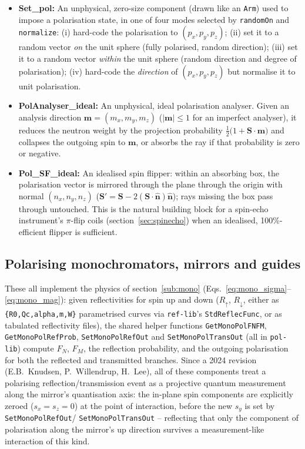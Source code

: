 \begin{itemize}
\item \textbf{Set\_pol:} An unphysical, zero-size component (drawn like an
  \texttt{Arm}) used to impose a polarisation state, in one of four modes
  selected by \texttt{randomOn} and \texttt{normalize}: (i) hard-code the
  polarisation to $(p_x,p_y,p_z)$; (ii) set it to a random vector \emph{on}
  the unit sphere (fully polarised, random direction); (iii) set it to a
  random vector \emph{within} the unit sphere (random direction and
  degree of polarisation); (iv) hard-code the \emph{direction} of
  $(p_x,p_y,p_z)$ but normalise it to unit polarisation.

\item \textbf{PolAnalyser\_ideal:} An unphysical, ideal polarisation
  analyser. Given an analysis direction $\mathbf{m}=(m_x,m_y,m_z)$
  ($|\mathbf{m}|\le 1$ for an imperfect analyser), it reduces the neutron
  weight by the projection probability
  $\tfrac12\bigl(1+\mathbf{S}\cdot\mathbf{m}\bigr)$ and collapses the
  outgoing spin to $\mathbf{m}$, or absorbs the ray if that probability is
  zero or negative.

\item \textbf{Pol\_SF\_ideal:} An idealised spin flipper: within an
  absorbing box, the polarisation vector is mirrored through the plane
  through the origin with normal $(n_x,n_y,n_z)$ ($\mathbf{S}' = \mathbf{S}
  - 2(\mathbf{S}\cdot\hat{\mathbf{n}})\hat{\mathbf{n}}$); rays missing the
  box pass through untouched. This is the natural building block for a
  spin-echo instrument's $\pi$-flip coils (section~\ref{sec:spinecho}) when
  an idealised, 100\%-efficient flipper is sufficient.
\end{itemize}

\subsection{Polarising monochromators, mirrors and guides}
\label{sub:mono-comps}

These all implement the physics of section~\ref{sub:mono}
(Eqs.~\ref{eq:mono_sigma}--\ref{eq:mono_mag}): given reflectivities for
spin up and down ($R_\uparrow$, $R_\downarrow$, either as
\texttt{\{R0,Qc,alpha,m,W\}} parametrised curves via \texttt{ref-lib}'s
\texttt{StdReflecFunc}, or as tabulated reflectivity files), the shared
helper functions \texttt{GetMonoPolFNFM}, \texttt{GetMonoPolRefProb},
\texttt{SetMonoPolRefOut} and \texttt{SetMonoPolTransOut} (all in
\texttt{pol-lib}) compute $F_N$, $F_M$, the reflection probability, and the
outgoing polarisation for both the reflected and transmitted branches.
Since a 2024 revision (E.B.~Knudsen, P.~Willendrup, H.~Lee), all of these
components treat a polarising reflection/transmission event as a
projective quantum measurement along the mirror's quantisation axis: the
in-plane spin components are explicitly zeroed ($s_x=s_z=0$) at the point
of interaction, before the new $s_y$ is set by \texttt{SetMonoPolRefOut}/
\texttt{SetMonoPolTransOut} -- reflecting that only the component of
polarisation along the mirror's up direction survives a measurement-like
interaction of this kind.

